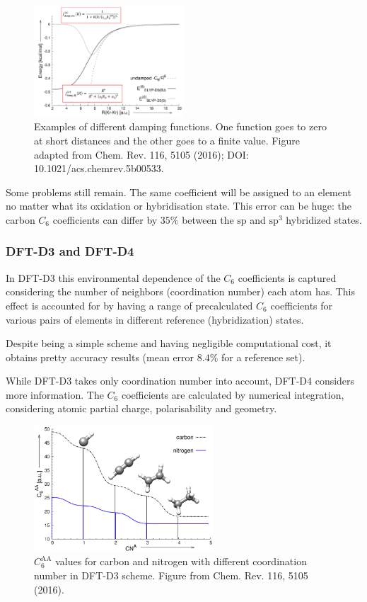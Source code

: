 \documentclass{article}
\theoremstyle{plain}\theoremheaderfont{\normalfont\itshape}\theorembodyfont{\rmfamily}\theoremseparator{.}\newtheorem*{rem}{Remark}\newtheorem*{ex}{Example}\newtheorem*{proof}{Proof}\newtheorem*{altp}{Alternative proof}
\theoremstyle{plain}\theoremheaderfont{\normalfont\bfseries}\theorembodyfont{\rmfamily}\theoremseparator{.}\newtheorem{thm}{Theorem}[section]\newtheorem{lem}[thm]{Lemma}\newtheorem{prop}[thm]{Proposition}\newtheorem*{cor}{Corollary}\newtheorem{defn}[thm]{Definition}\newtheorem{clm}[thm]{Claim}\newtheorem{clminproof}{Claim}\newtheorem{pos}{Postulate}[section]
\theoremstyle{break}\theoremheaderfont{\normalfont\itshape}\theorembodyfont{\rmfamily}\theoremseparator{.\medskip}\newtheorem*{proofskip}{Proof}\newtheorem*{exs}{Examples}\newtheorem*{rems}{Remarks}
\theoremstyle{break}\theoremheaderfont{\normalfont\bfseries}\theorembodyfont{\rmfamily}\theoremseparator{.\medskip}\newtheorem{lemskip}[thm]{Lemma}\newtheorem{defnskip}[thm]{Definition}\newtheorem{propskip}[thm]{Proposition}\newtheorem{thmskip}[thm]{Theorem}
\numberwithin{equation}{section}
\begin{document}
    \begin{figure}
        \centering
        \includegraphics[width=0.5\textwidth]{damping.png}
        \caption{Examples of different damping functions. One function goes to zero at short distances and the other goes to a finite value. Figure adapted from Chem. Rev. 116, 5105 (2016); DOI: 10.1021/acs.chemrev.5b00533.}
    \end{figure}

    Some problems still remain. The same coefficient will be assigned to an element no matter what its oxidation or hybridisation state. This error can be huge: the carbon \(C_6\) coefficients can differ by \(35\%\) between the \(\mathrm{sp}\) and \(\mathrm{sp^3}\) hybridized states.

    \subsubsection*{DFT-D3 and DFT-D4}
    In DFT-D3 this environmental dependence of the \(C_6\) coefficients is captured considering the number of neighbors (coordination number) each atom has. This effect is accounted for by having a range of precalculated \(C_6\) coefficients for various pairs of elements in different reference (hybridization) states.

    Despite being a simple scheme and having negligible computational cost, it obtains pretty accuracy results (mean error \(8.4\%\) for a reference set).

    While DFT-D3 takes only coordination number into account, DFT-D4 considers more information. The \(C_6\) coefficients are calculated by numerical integration, considering atomic partial charge, polarisability and geometry.

    \begin{figure}
        \centering
        \includegraphics[width=0.6\textwidth]{DFTD3.png}
        \caption{\(C_6^{\mathrm{AA}}\) values for carbon and nitrogen with different coordination number in DFT-D3 scheme. Figure from Chem. Rev. 116, 5105 (2016).}
    \end{figure}
\end{document}

